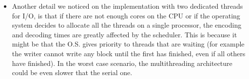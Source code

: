 \begin{itemize}
\item Another detail we noticed on the implementation with two dedicated threads for I/O, is that if there are not enough cores on the CPU or if the operating system decides to allocate all the threads on a single processor, the encoding and decoding times are greatly affected by the scheduler. This is because it might be that the O.S. gives priority to threads that are waiting (for example the writer cannot write any block until the first has finished, even if all others have finished). In the worst case scenario, the multithreading architecture could be even slower that the serial one.

\end{itemize}
